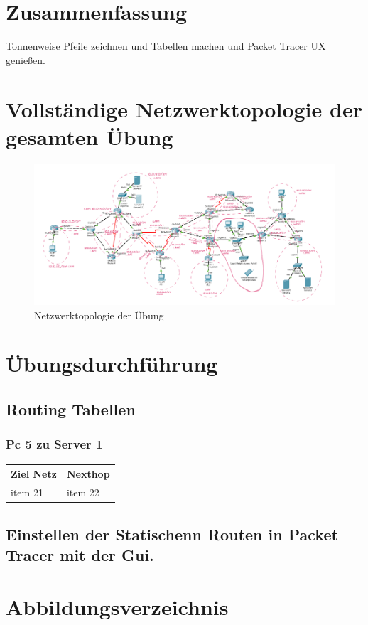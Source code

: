 \documentclass[a4paper]{article}
\begin{document}
\section{Zusammenfassung}
Tonnenweise Pfeile zeichnen und Tabellen machen und Packet Tracer UX genießen.
\newpage

\section{Vollständige Netzwerktopologie der gesamten Übung}

\begin{figure}[h]
	\includegraphics[scale=0.5]{topologie.png}
	\caption{Netzwerktopologie der Übung}
\end{figure}

\newpage

\section{Übungsdurchführung}

\subsection{Routing Tabellen}
\subsubsection{Pc 5 zu Server 1}

\begin{tabularx}{0.69\textwidth} { 
		| >{\raggedright\arraybackslash}X 
		| >{\centering\arraybackslash}X| 
	}
	\hline
	Ziel Netz & Nexthop\\
	\hline
	item 21  & item 22    \\
	\hline
\end{tabularx}

\subsection{Einstellen der Statischenn Routen in Packet Tracer mit der Gui.}

\newpage

\section{Abbildungsverzeichnis}

\listoffigures
\end{document}

